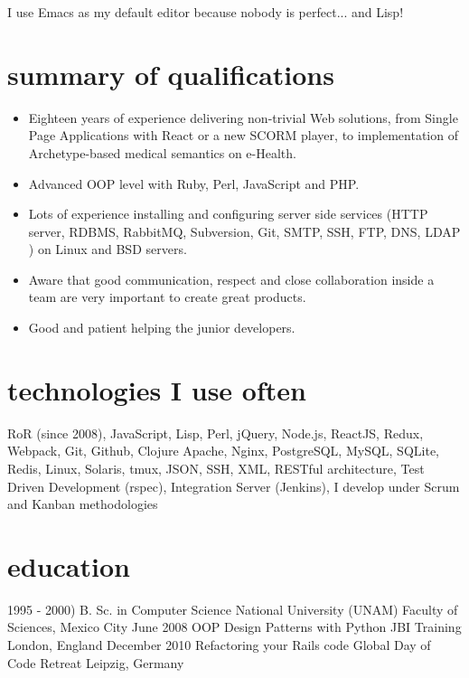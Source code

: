 \documentclass[]{k-cv}
\begin{document}
I use Emacs as my default editor because nobody is perfect... and Lisp!

\section{summary of qualifications}
  \begin{itemize}
    \item Eighteen years of experience delivering non-trivial Web solutions, from Single Page Applications
          with React or a new SCORM player, to implementation of Archetype-based medical semantics on e-Health.
    \item Advanced OOP level with Ruby, Perl, JavaScript and PHP.
    \item Lots of experience installing and configuring server side services (HTTP server,
          RDBMS, RabbitMQ, Subversion, Git, SMTP, SSH, FTP, DNS, LDAP ) on Linux and
          BSD servers.
    \item Aware that good communication, respect and close collaboration inside a team
          are very important to create great products.
    \item Good and patient helping the junior developers.
   \end{itemize}

\section{technologies I use often}

    RoR (since 2008), JavaScript, Lisp, Perl, jQuery, Node.js, ReactJS, Redux, Webpack, Git,
    Github, Clojure Apache, Nginx, PostgreSQL, MySQL, SQLite, Redis, Linux, Solaris,
    tmux, JSON, SSH, XML, RESTful architecture, Test Driven Development (rspec),
    Integration Server (Jenkins), I develop under Scrum and Kanban methodologies

\section{education}

\begin{entrylist}
  \entry
    {1995 - 2000)}
    {B. Sc. in Computer Science}
    {National University (UNAM)}
	  {Faculty of Sciences, Mexico City}
  \entry
    {June 2008}
    {OOP Design Patterns with Python}
    {JBI Training}
    {London, England}
   \entry
    {December 2010}
    {Refactoring your Rails code}
    {Global Day of Code Retreat}
    {Leipzig, Germany}

\end{entrylist}
\end{document}
